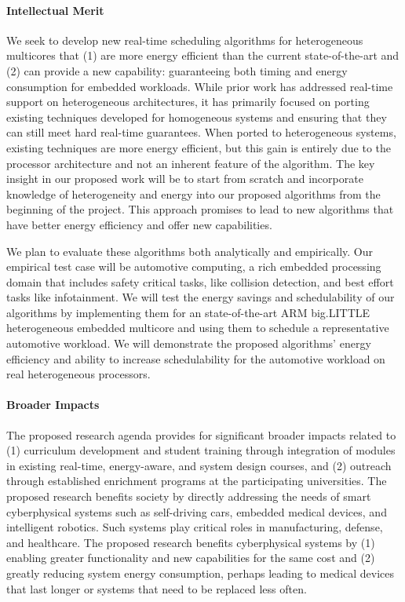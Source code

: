 \documentclass[10pt,letterpaper]{article}
\begin{document}
\paragraph{Intellectual Merit} 
We seek to develop new real-time scheduling algorithms for
heterogeneous multicores that (1) are more energy efficient than the
current state-of-the-art and (2) can provide a new capability:
guaranteeing both timing and energy consumption for embedded
workloads.  While prior work has addressed real-time support on
heterogeneous architectures, it has primarily focused on porting
existing techniques developed for homogeneous systems and ensuring
that they can still meet hard real-time guarantees.  When ported to
heterogeneous systems, existing techniques are more energy efficient,
but this gain is entirely due to the processor architecture and not an
inherent feature of the algorithm.  The key insight in our proposed
work will be to start from scratch and incorporate knowledge of
heterogeneity and energy into our proposed algorithms from the
beginning of the project.  This approach promises to lead to new
algorithms that have better energy efficiency and offer new
capabilities.

We plan to evaluate these algorithms both analytically and
empirically.  Our empirical test case will be automotive computing, a
rich embedded processing domain that includes safety critical tasks,
like collision detection, and best effort tasks like infotainment.  We
will test the energy savings and schedulability of our algorithms by
implementing them for an state-of-the-art ARM big.LITTLE heterogeneous
embedded multicore and using them to schedule a representative
automotive workload.  We will demonstrate the proposed algorithms'
energy efficiency and ability to increase schedulability for the
automotive workload on real heterogeneous processors.

\paragraph{Broader Impacts}
The proposed research agenda provides for significant broader impacts
related to (1) curriculum development and student training through
integration of modules in existing real-time, energy-aware, and system
design courses, and (2) outreach through established enrichment
programs at the participating universities. The proposed research
benefits society by directly addressing the needs of smart
cyberphysical systems such as self-driving cars, embedded medical
devices, and intelligent robotics.  Such systems play critical roles
in manufacturing, defense, and healthcare. The proposed research
benefits cyberphysical systems by (1) enabling greater functionality
and new capabilities for the same cost and (2) greatly reducing system
energy consumption, perhaps leading to medical devices that last
longer or systems that need to be replaced less often.
\end{document}
